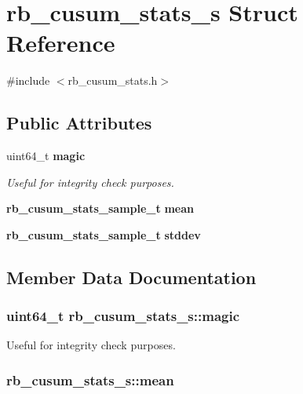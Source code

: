 \section{rb\+\_\+cusum\+\_\+stats\+\_\+s Struct Reference}
\label{structrb__cusum__stats__s}


{\ttfamily \#include $<$rb\+\_\+cusum\+\_\+stats.\+h$>$}

\subsection*{Public Attributes}
\begin{DoxyCompactItemize}
\item 
uint64\+\_\+t {\bf magic}
\begin{DoxyCompactList}\small\item\em Useful for integrity check purposes. \end{DoxyCompactList}\item 
{\bf rb\+\_\+cusum\+\_\+stats\+\_\+sample\+\_\+t} {\bf mean}
\item 
{\bf rb\+\_\+cusum\+\_\+stats\+\_\+sample\+\_\+t} {\bf stddev}
\end{DoxyCompactItemize}


\subsection{Member Data Documentation}
\subsubsection[{magic}]{\setlength{\rightskip}{0pt plus 5cm}uint64\+\_\+t rb\+\_\+cusum\+\_\+stats\+\_\+s\+::magic}\label{structrb__cusum__stats__s_a8ceab0659e207c9ff78de35c9a5c7e9b}


Useful for integrity check purposes. 

\subsubsection[{mean}]{ rb\+\_\+cusum\+\_\+stats\+\_\+s\+::mean}\label{structrb__cusum__stats__s_a8c133ce0d343dec10683de6206b283e9}

